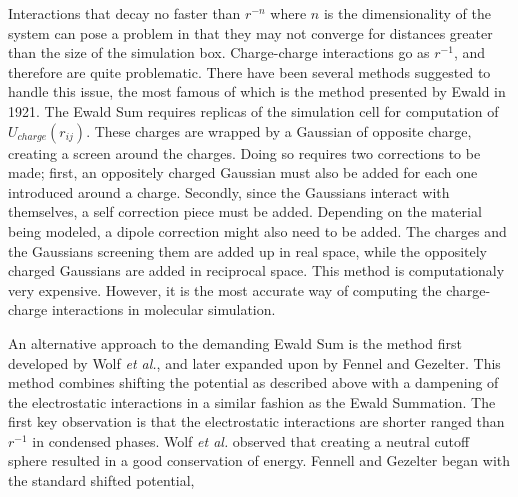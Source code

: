 
Interactions that decay no faster than $r^{-n}$ where $n$ is the
dimensionality of the system can pose a problem in that they may not
converge for distances greater than the size of the simulation
box. Charge-charge interactions go as $r^{-1}$, and therefore are
quite problematic. There have been several methods suggested to handle
this issue, the most famous of which is the method presented by Ewald
in 1921. The Ewald Sum requires replicas of the simulation cell for
computation of $U_{charge}(r_{ij})$. These charges are wrapped by
a Gaussian of opposite charge, creating a screen around the
charges. Doing so requires two corrections to be made; first, an
oppositely charged Gaussian must also be added for each one introduced
around a charge. Secondly, since the Gaussians interact with
themselves, a self correction piece must be added. Depending
on the material being modeled, a dipole correction might also need to
be added. The charges and the Gaussians screening them are added
up in real space, while the oppositely charged Gaussians are added in
reciprocal space. This method is computationaly very expensive.
However, it is the most accurate way of computing the charge-charge
interactions in molecular simulation. 

An alternative approach to the demanding Ewald Sum is the method first
developed by Wolf \textit{et al.}\cite{Wolf1999}, and later expanded
upon by Fennel and Gezelter.\cite{Fennell2006} This method combines
shifting the potential as described above with a dampening of the
electrostatic interactions in a similar fashion as the Ewald
Summation. The first key observation is that the electrostatic
interactions are shorter ranged than $r^{-1}$ in condensed
phases. Wolf \textit{et al.}  observed that creating a neutral cutoff
sphere resulted in a good conservation of energy. Fennell and Gezelter
began with the standard shifted potential,

